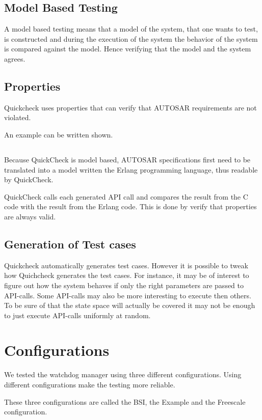 \documentclass[a4paper]{article}
\begin{document}
\subsection{Model Based Testing}
A model based testing means that a model of the system, that one wants to test,
is constructed and during the execution of the system the behavior of the system is
compared against the model. Hence verifying that the model and the system agrees.

\subsection{Properties}
Quickcheck uses properties that can verify that AUTOSAR requirements are not
violated.

An example can be written shown.

\subsection{}
Because QuickCheck is model based, AUTOSAR specifications first need
to be translated into a model written the Erlang programming language,
thus readable by QuickCheck.

QuickCheck calls each generated API call and compares the result from
the C code with the result from the Erlang code. This is done by verify that
properties are always valid.

\subsection{Generation of Test cases}
Quickcheck automatically generates test cases. However it is possible to tweak
how Quichcheck generates the test cases. For instance, it may be of interest to
figure out how the system behaves if only the right parameters are passed to
API-calls. Some API-calls may also be more interesting to execute then others.
To be sure of that the state space will actually be covered it may not be enough
to just execute API-calls uniformly at random.

\section{Configurations}
We tested the watchdog manager using three different
configurations. Using different configurations make the testing more
reliable.

These three configurations are called the BSI, the Example and the
Freescale configuration.
\end{document}
